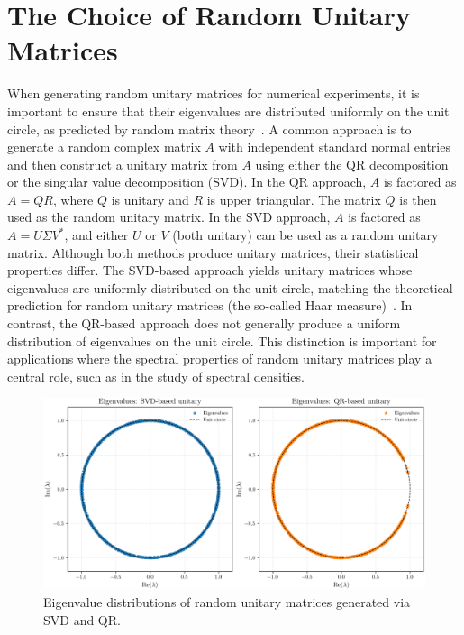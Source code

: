 \section{The Choice of Random Unitary Matrices}

When generating random unitary matrices for numerical experiments, it is important to ensure that their eigenvalues are distributed uniformly on the unit circle, as predicted by random matrix theory~\cite{mezzadri2007}. A common approach is to generate a random complex matrix $A$ with independent standard normal entries and then construct a unitary matrix from $A$ using either the QR decomposition or the singular value decomposition (SVD). In the QR approach, $A$ is factored as $A = QR$, where $Q$ is unitary and $R$ is upper triangular. The matrix $Q$ is then used as the random unitary matrix. In the SVD approach, $A$ is factored as $A = U \Sigma V^*$, and either $U$ or $V$ (both unitary) can be used as a random unitary matrix.
Although both methods produce unitary matrices, their statistical properties differ.
The SVD-based approach yields unitary matrices whose eigenvalues are uniformly distributed on the unit circle,
matching the theoretical prediction for random unitary matrices (the so-called Haar measure)~\cite{mezzadri2007}.
In contrast, the QR-based approach does not generally produce a uniform distribution of eigenvalues on the unit circle. This distinction is important for applications where the spectral properties of random unitary matrices play a central role, such as in the study of spectral densities.

\begin{figure}[H]
    \centering
    \includegraphics[width=1\textwidth]{Graphics/eigenvalue_comparison.png}
    \caption{Eigenvalue distributions of random unitary matrices generated via SVD and QR.}
    \label{fig:eigenvalue-comparison}
\end{figure}

